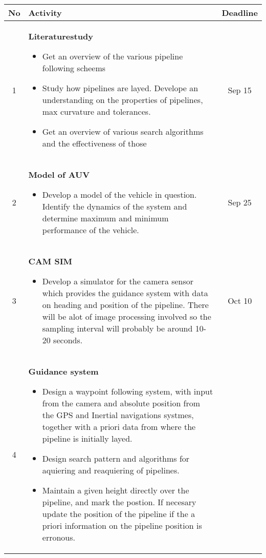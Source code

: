 \documentclass[a4paper,10pt]{article}
\begin{document}
	\begin{tabular}{| c | p{8.5cm} || c |}
	\hline
	No 	&	Activity	&	Deadline \\
	\hline
	\hline
	1	&	\textbf{Literaturestudy}\begin{itemize}
	 	 				 \item Get an overview of the various pipeline following scheems
	 	 				 \item Study how pipelines are layed. Develope an understanding on the properties of pipelines, max curvature and tolerances.
	 	 				 \item Get an overview of various search algorithms and the effectiveness of those
	 	 				\end{itemize}	
								& 	Sep 15\\
	\hline
	2	&	\textbf{Model of AUV}	\begin{itemize}
	 	 	            		 \item Develop a model of the vehicle in question. Identify the dynamics of the system and determine maximum and minimum performance of the vehicle.
	 	 	            		\end{itemize}
								&	Sep 25\\
	\hline
	3	&	\textbf{CAM SIM}	\begin{itemize}
	 	 	       			 \item Develop a simulator for the camera sensor which provides the guidance system with data on heading and position of the pipeline. There will be alot of image processing involved so the sampling interval will probably be around 10-20 seconds.
	 	 	       			\end{itemize}
								&	Oct 10 \\
	\hline
	4	&	\textbf{Guidance system}\begin{itemize}
	 	 	               		 \item Design a waypoint following system, with input from the camera and absolute position from the GPS and Inertial navigations systmes, together with a priori data from where the pipeline is initially layed. 
	 	 	               		 \item Design search pattern and algorithms for aquiering and reaquiering of pipelines. 
	 	 	               		 \item Maintain a given height directly over the pipeline, and mark the postion. If necesary update the position of the pipeline if the a priori information on the pipeline position is erronous. 
	 	 	               		\end{itemize}

\end{tabular}
\end{document}
